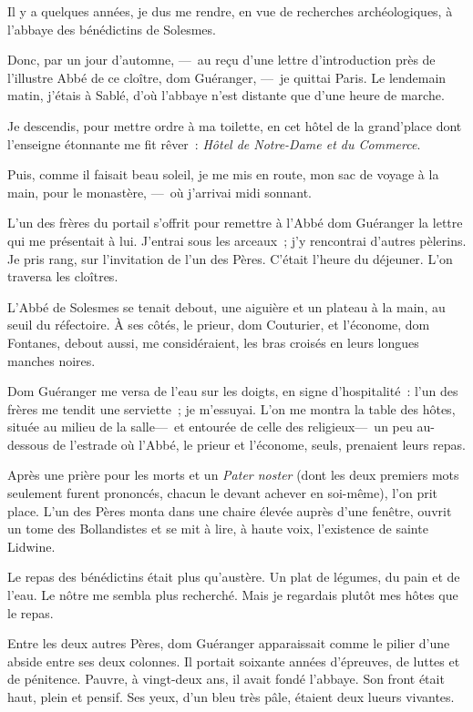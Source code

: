 \documentclass[french,twoside]{book} %
\newcommand{\bibl}[1]{{\RaggedLeft{#1}\par\bigskip}}
\begin{document}
\bibl{Saint Paul.}
\noindent Il y a quelques années, je dus me rendre, en vue de recherches archéologiques, à l’abbaye des bénédictins de Solesmes.\par
Donc, par un jour d’automne, — au reçu d’une lettre d’introduction près de l’illustre Abbé de ce cloître, dom Guéranger, — je quittai Paris. Le lendemain matin, j’étais à Sablé, d’où l’abbaye n’est distante que d’une heure de marche.\par
Je descendis, pour mettre ordre à ma toilette, en cet hôtel de la grand’place dont l’enseigne étonnante me fit rêver : \emph{Hôtel de Notre-Dame et du Commerce}.\par
Puis, comme il faisait beau soleil, je me mis   en route, mon sac de voyage à la main, pour le monastère, — où j’arrivai midi sonnant.\par
L’un des frères du portail s’offrit pour remettre à l’Abbé dom Guéranger la lettre qui me présentait à lui. J’entrai sous les arceaux ; j’y rencontrai d’autres pèlerins. Je pris rang, sur l’invitation de l’un des Pères. C’était l’heure du déjeuner. L’on traversa les cloîtres.\par
L’Abbé de Solesmes se tenait debout, une aiguière et un plateau à la main, au seuil du réfectoire. À ses côtés, le prieur, dom Couturier, et l’économe, dom Fontanes, debout aussi, me considéraient, les bras croisés en leurs longues manches noires.\par
Dom Guéranger me versa de l’eau sur les doigts, en signe d’hospitalité : l’un des frères me tendit une serviette ; je m’essuyai. L’on me montra la table des hôtes, située au milieu de la salle— et entourée de celle des religieux— un peu au-dessous de l’estrade où l’Abbé, le prieur et l’économe, seuls, prenaient leurs repas.\par
Après une prière pour les morts et un \emph{Pater noster} (dont les deux premiers mots seulement   furent prononcés, chacun le devant achever en soi-même), l’on prit place. L’un des Pères monta dans une chaire élevée auprès d’une fenêtre, ouvrit un tome des Bollandistes et se mit à lire, à haute voix, l’existence de sainte Lidwine.\par
Le repas des bénédictins était plus qu’austère. Un plat de légumes, du pain et de l’eau. Le nôtre me sembla plus recherché. Mais je regardais plutôt mes hôtes que le repas.\par
Entre les deux autres Pères, dom Guéranger apparaissait comme le pilier d’une abside entre ses deux colonnes. Il portait soixante années d’épreuves, de luttes et de pénitence. Pauvre, à vingt-deux ans, il avait fondé l’abbaye. Son front était haut, plein et pensif. Ses yeux, d’un bleu très pâle, étaient deux lueurs vivantes.\par
\end{document}

